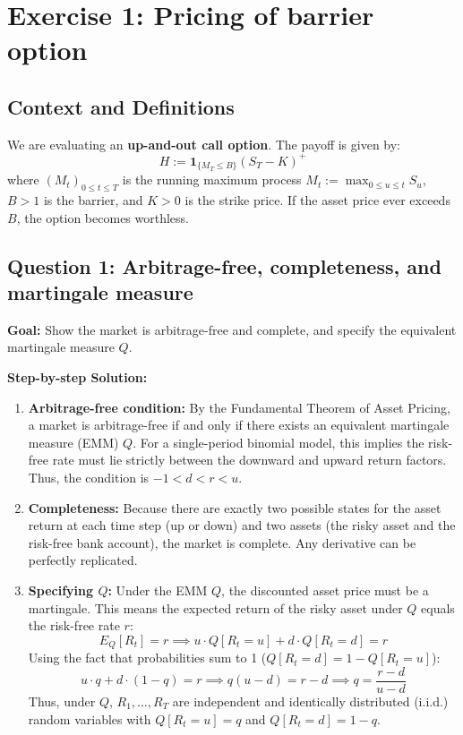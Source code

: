 \section*{Exercise 1: Pricing of barrier option}

\subsection*{Context and Definitions}
We are evaluating an \textbf{up-and-out call option}. The payoff is given by:
\begin{equation*}
    H := \mathbf{1}_{\{M_T \le B\}}(S_T - K)^+
\end{equation*}
where $(M_t)_{0 \le t \le T}$ is the running maximum process $M_t := \max_{0 \le u \le t} S_u$, $B > 1$ is the barrier, and $K > 0$ is the strike price. If the asset price ever exceeds $B$, the option becomes worthless.

\subsection*{Question 1: Arbitrage-free, completeness, and martingale measure}
\textbf{Goal:} Show the market is arbitrage-free and complete, and specify the equivalent martingale measure $Q$.

\vspace{0.5cm}
\noindent \textbf{Step-by-step Solution:}
\begin{enumerate}
    \item \textbf{Arbitrage-free condition:} By the Fundamental Theorem of Asset Pricing, a market is arbitrage-free if and only if there exists an equivalent martingale measure (EMM) $Q$. For a single-period binomial model, this implies the risk-free rate must lie strictly between the downward and upward return factors. Thus, the condition is $-1 < d < r < u$.
    \item \textbf{Completeness:} Because there are exactly two possible states for the asset return at each time step (up or down) and two assets (the risky asset and the risk-free bank account), the market is complete. Any derivative can be perfectly replicated.
    \item \textbf{Specifying $Q$:} Under the EMM $Q$, the discounted asset price must be a martingale. This means the expected return of the risky asset under $Q$ equals the risk-free rate $r$:
    \begin{equation*}
        E_Q[R_t] = r \implies u \cdot Q[R_t = u] + d \cdot Q[R_t = d] = r
    \end{equation*}
    Using the fact that probabilities sum to 1 ($Q[R_t = d] = 1 - Q[R_t = u]$):
    \begin{equation*}
        u \cdot q + d \cdot (1 - q) = r \implies q(u - d) = r - d \implies q = \frac{r - d}{u - d}
    \end{equation*}
    Thus, under $Q$, $R_1, \dots, R_T$ are independent and identically distributed (i.i.d.) random variables with $Q[R_t = u] = q$ and $Q[R_t = d] = 1 - q$.
\end{enumerate}

